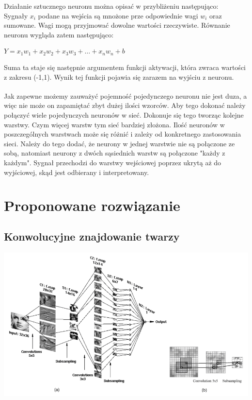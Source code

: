 \documentclass[11pt,a4paper]{article}
\begin{document}
Działanie sztucznego neuronu można opisać w przybliżeniu następująco:\\
Sygnały $x_{i}$ podane na wejścia są mnożone prze odpowiednie wagi $w_{i}$ oraz sumowane.
 Wagi mogą przyjmować dowolne wartości rzeczywiste. Równanie neuronu wygląda zatem następująco:
\begin{center}
$Y = x_{1}w_{1} + x_{2}w_{2} + x_{3}w_{3} + … + x_{n}w_{n} + b$\\
\end{center}
Suma ta staje się następnie argumentem funkcji aktywacji, która zwraca wartości z zakresu 
(-1,1). Wynik tej funkcji pojawia się zarazem na wyjściu z neuronu.\\
\\
Jak zapewne możemy zauważyć pojemność pojedynczego neuronu nie jest duza, a więc nie może on zapamiętać 
zbyt dużej ilości wzorców. Aby tego dokonać należy połączyć wiele pojedynczych neuronów w sieć. 
Dokonuje się tego tworząc kolejne warstwy. Czym więcej warstw tym sieć bardziej złożona.
 Ilość neuronów w poszczególnych warstwach może się różnić i zależy od konkretnego zastosowania sieci.
 Należy do tego dodać, że neurony w jednej warstwie nie są połączone ze sobą, natomiast neurony z dwóch
 sąsiednich warstw są połączone "każdy z każdym". Sygnał przechodzi do warstwy wejściowej poprzez ukrytą 
aż do wyjściowej, skąd jest odbierany i interpretowany.
\section{Proponowane rozwiązanie}
\subsection{Konwolucyjne znajdowanie twarzy}
\vspace*{1cm}
\includegraphics[scale=0.7]{schemat}
\vspace*{1cm}
\end{document}
